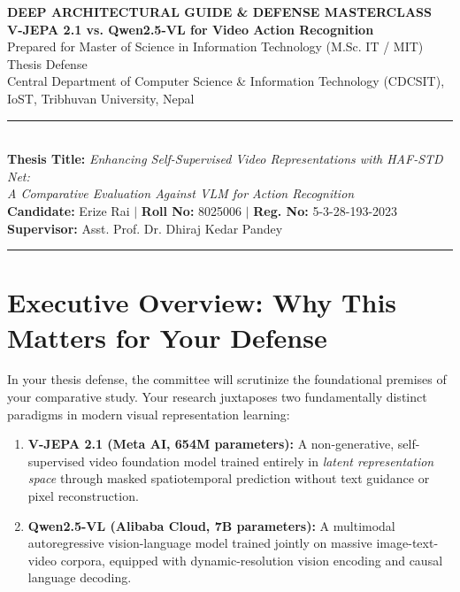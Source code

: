 \documentclass[a4paper, 11pt]{article}
\begin{document}
\begin{center}
  {\fontsize{18}{22}\selectfont \textbf{\color{primaryblue}DEEP ARCHITECTURAL GUIDE \& DEFENSE MASTERCLASS}}\\[3pt]
  {\fontsize{13}{16}\selectfont \textbf{\color{accentdark}V-JEPA 2.1 vs. Qwen2.5-VL for Video Action Recognition}}\\[3pt]
  {\fontsize{10}{13}\selectfont Prepared for Master of Science in Information Technology (M.Sc. IT / MIT) Thesis Defense}\\[2pt]
  {\fontsize{10}{13}\selectfont Central Department of Computer Science \& Information Technology (CDCSIT), IoST, Tribhuvan University, Nepal}\\[6pt]
  \rule{\textwidth}{1.2pt}\\[5pt]
  {\fontsize{10}{13}\selectfont \textbf{Thesis Title:} \textit{Enhancing Self-Supervised Video Representations with HAF-STD Net:}}\\
  {\fontsize{10}{13}\selectfont \textit{A Comparative Evaluation Against VLM for Action Recognition}}\\[5pt]
  \textbf{Candidate:} Erize Rai \quad$|$ \quad \textbf{Roll No:} 8025006 \quad$|$ \quad \textbf{Reg. No:} 5-3-28-193-2023\\
  \textbf{Supervisor:} Asst. Prof. Dr. Dhiraj Kedar Pandey\\[2pt]
  \rule{\textwidth}{0.6pt}
\end{center}

\vspace{0.2cm}
\tableofcontents
\newpage

\section{Executive Overview: Why This Matters for Your Defense}

In your thesis defense, the committee will scrutinize the foundational premises of your comparative study. Your research juxtaposes two fundamentally distinct paradigms in modern visual representation learning:
\begin{enumerate}
    \item \textbf{V-JEPA 2.1 (Meta AI, 654M parameters):} A non-generative, self-supervised video foundation model trained entirely in \emph{latent representation space} through masked spatiotemporal prediction without text guidance or pixel reconstruction.
    \item \textbf{Qwen2.5-VL (Alibaba Cloud, 7B parameters):} A multimodal autoregressive vision-language model trained jointly on massive image-text-video corpora, equipped with dynamic-resolution vision encoding and causal language decoding.
\end{enumerate}
\end{document}
